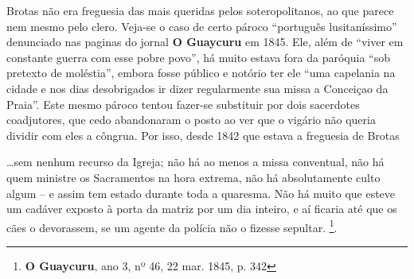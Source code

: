 Brotas não era freguesia das mais queridas pelos soteropolitanos, ao que parece nem mesmo pelo clero. Veja-se o caso de certo pároco ``português lusitaníssimo'' denunciado nas paginas do jornal \textbf{O Guaycuru} em 1845. Ele, além de ``viver em constante guerra com esse pobre povo'', há muito estava fora da paróquia ``sob pretexto de moléstia'', embora fosse público e notório ter ele ``uma capelania na cidade e nos dias desobrigados ir dizer regularmente sua missa a Conceiçao da Praia''. Este mesmo pároco tentou fazer-se substituir por dois sacerdotes coadjutores, que cedo abandonaram o posto ao ver que o vigário não queria dividir com eles a côngrua. Por isso, desde 1842 que estava a freguesia de Brotas 

\begin{citacao}
\dots sem nenhum recurso da Igreja; não há ao menos a missa conventual, não há quem ministre os Sacramentos na hora extrema, não há absolutamente culto algum -- e assim tem estado durante toda a quaresma. Não há muito que esteve um cadáver exposto à porta da matriz por um dia inteiro, e aí ficaria até que os cães o devorassem, se um agente da polícia não o fizesse sepultar. \footnote{\textbf{O Guaycuru}, ano 3, nº 46, 22 mar. 1845, p. 342}. 
\end{citacao}


